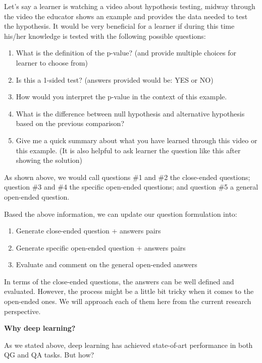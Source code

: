 \documentclass[]{book}
\theoremstyle{definition}
\theoremstyle{definition}
\theoremstyle{definition}
\theoremstyle{remark}
\begin{document}
Let's say a learner is watching a video about hypothesis testing, midway
through the video the educator shows an example and provides the data
needed to test the hypothesis. It would be very beneficial for a learner
if during this time his/her knowledge is tested with the following
possible questions:

\begin{enumerate}
\def\labelenumi{\arabic{enumi}.}
\item
  What is the definition of the p-value? (and provide multiple choices
  for learner to choose from)
\item
  Is this a 1-sided test? (answers provided would be: YES or NO)
\item
  How would you interpret the p-value in the context of this example.
\item
  What is the difference between null hypothesis and alternative
  hypothesis based on the previous comparison?
\item
  Give me a quick summary about what you have learned through this video
  or this example. (It is also helpful to ask learner the question like
  this after showing the solution)
\end{enumerate}

As shown above, we would call questions \#1 and \#2 the close-ended
questions; question \#3 and \#4 the specific open-ended questions; and
question \#5 a general open-ended question.

Based the above information, we can update our question formulation
into:

\begin{enumerate}
\def\labelenumi{\arabic{enumi}.}
\item
  Generate close-ended question + answers pairs
\item
  Generate specific open-ended question + answers pairs
\item
  Evaluate and comment on the general open-ended answers
\end{enumerate}

In terms of the close-ended questions, the answers can be well defined
and evaluated. However, the process might be a little bit tricky when it
comes to the open-ended ones. We will approach each of them here from
the current research perspective.

\textbf{Why deep learning? }

As we stated above, deep learning has achieved state-of-art performance
in both QG and QA tasks. But how?
\end{document}
